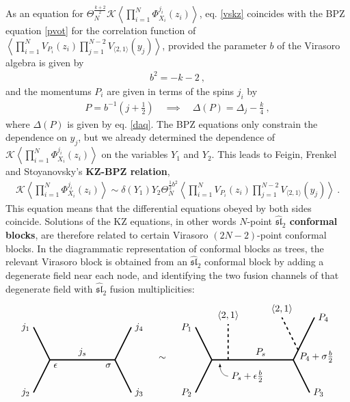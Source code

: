 \documentclass[12pt, a4paper, notitlepage, twoside]{report}
\numberwithin{equation}{section}
\theoremstyle{break}
\begin{document}
As an equation for $\Theta_N^{\frac{k+2}{2}}\mathcal{K}\left\langle \prod_{i=1}^N \Phi^{j_i}_{X_i}(z_i)\right\rangle$,
eq. \eqref{vskz} coincides with the BPZ equation \eqref{pvot} for the correlation function of $\left\langle \prod_{i=1}^N V_{P_i}(z_i) \prod_{j=1}^{N-2}V_{\langle 2,1\rangle}(y_j)\right\rangle$, provided the parameter $b$ of the Virasoro algebra is given by 
\begin{align}
 \boxed{ b^2 = -k-2}\ ,
\label{bk}
\end{align}
and the momentums $P_i$ are given in terms of the spins $j_i$ by 
\begin{align}
 \boxed{P = b^{-1}\left(j+\tfrac12\right)}\quad \implies \quad \boxed{\Delta(P) = \Delta_j-\frac{k}{4}}\ ,
\label{aj}
\end{align}
where $\Delta(P)$ is given by eq. \eqref{daq}.
The BPZ equations only constrain the dependence on $y_j$, but we already determined the dependence of  
$\mathcal{K}\left\langle \prod_{i=1}^N \Phi^{j_i}_{X_i}(z_i)\right\rangle$ on the variables $Y_1$ and $Y_2$.
This leads to Feigin, Frenkel and Stoyanovsky's \textbf{\boldmath KZ-BPZ relation},
\begin{align}
 \boxed{ \mathcal{K}\left\langle \prod_{i=1}^N \Phi^{j_i}_{X_i}(z_i)\right\rangle \sim \delta(Y_1) Y_2 \Theta_N^{\frac12 b^2} \left\langle \prod_{i=1}^N V_{P_i}(z_i)\prod_{j=1}^{N-2}V_{\langle 2,1\rangle}(y_j)\right\rangle}\ .
\label{dyy}
\end{align}
This equation means that the differential equations obeyed by both sides coincide.
Solutions of the KZ equations, in other words $N$-point \textbf{\boldmath $\widehat{\mathfrak{sl}}_2$ conformal blocks}, are therefore related to certain Virasoro $(2N-2)$-point conformal blocks. 
In the diagrammatic representation of conformal blocks as trees, the relevant Virasoro block is obtained from an $\widehat{\mathfrak{sl}}_2$ conformal block by adding a degenerate field near each node, and identifying the two fusion channels of that degenerate field with $\widehat{\mathfrak{sl}}_2$ fusion multiplicities:
\begin{align}
\begin{tikzpicture}[baseline={(0,0)}, very thick, scale = .6]
\draw (-1,2) node [left] {$j_1$} -- (0,0) node[below right] {$\epsilon$} -- node [above] {$j_s$} (4,0) node[below left] {$\sigma$} -- (5,2) node [right] {$j_4$};
\draw (-1,-2) node [left] {$j_2$} -- (0,0);
\draw (4,0) -- (5,-2) node [right] {$j_3$};
\end{tikzpicture}
\quad \sim \quad  
\begin{tikzpicture}[baseline={(0,0)}, very thick, scale = .6]
\draw (-1,2) node [left] {$P_1$} -- (0,0) -- (1,0) -- node [above] {$P_s$} (5,0) -- (6.3,2.6) node [right] {$P_4$};
\draw (-1,-2) node [left] {$P_2$} -- (0,0);
\draw (5,0) -- (6,-2) node [right] {$P_3$};
\draw[dashed] (1,0) -- (1,2.2) node[above] {$\left<2,1\right>$};
\draw[dashed] (5.3, .6) -- (4.3, 2.6) node[above] {$\left<2,1\right>$};
\node[right] at (5.15, .2) {$P_4+\sigma \frac{b}{2}$};
\draw[thin, latex-] (.5, -.2) to[out = -90, in = 180] (1,-1) node [right] {$P_s + \epsilon \frac{b}{2}$};
\end{tikzpicture}
\end{align}
\end{document}
